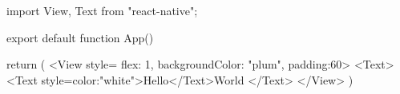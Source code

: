 import { View, Text } from "react-native";

export default function App() {
  return (
    <View style={{ flex: 1, backgroundColor: "plum", padding:60}}>
      <Text>
      <Text style={{color:"white"}}>Hello</Text>World
      </Text>
    </View>
  )

}